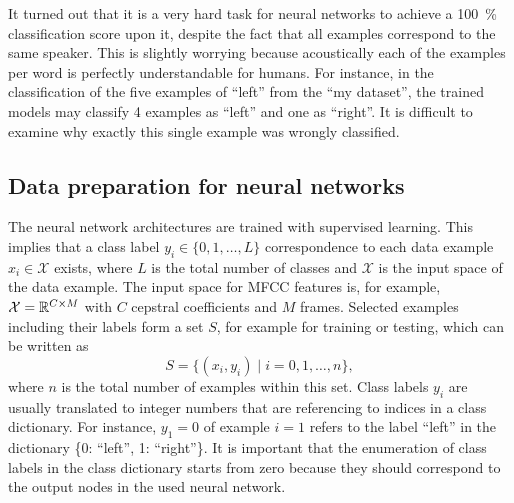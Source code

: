 \FloatBarrier
\noindent
It turned out that it is a very hard task for neural networks to achieve a \SI{100}{\percent} classification score upon it, despite the fact that all examples correspond to the same speaker.
This is slightly worrying because acoustically each of the examples per word is perfectly understandable for humans.
For instance, in the classification of the five examples of \enquote{left} from the \enquote{my dataset}, the trained models may classify 4 examples as \enquote{left} and one as \enquote{right}.
It is difficult to examine why exactly this single example was wrongly classified.



\subsection{Data preparation for neural networks}\label{sec:exp_data_prep}
The neural network architectures are trained with supervised learning.
This implies that a class label $y_i \in \{0, 1, \dots, L\}$ correspondence to each data example $x_i \in \mathcal{X}$ exists, where $L$ is the total number of classes and $\mathcal{X}$ is the input space of the data example.
The input space for MFCC features is, for example, $\mathcal{X} = \mathbb{R}^{C \times M}$ with $C$ cepstral coefficients and $M$ frames.
Selected examples including their labels form a set $S$, for example for training or testing, which can be written as
\begin{equation}\label{eq:exp_dataset}
  S = \{ (x_i, y_i) \mid i = 0, 1, \dots, n \},
\end{equation}
where $n$ is the total number of examples within this set.
Class labels $y_i$ are usually translated to integer numbers that are referencing to indices in a class dictionary.
For instance, $y_1 = 0$ of example $i=1$ refers to the label \enquote{left} in the dictionary \{0: \enquote{left}, 1: \enquote{right}\}.
It is important that the enumeration of class labels in the class dictionary starts from zero because they should correspond to the output nodes in the used neural network.

